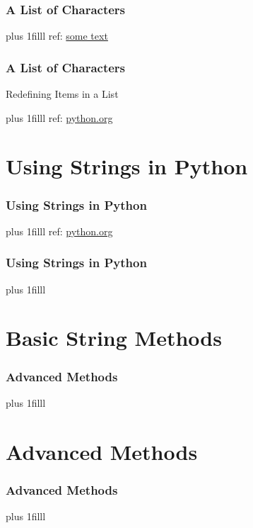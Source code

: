 \documentclass[fleqn]{beamer} %
\newcommand{\sectiontitleII}{A List of Characters }
\newcommand{\sectiontitleIII}{Using Strings in Python}
\newcommand{\sectiontitleIV}{Basic String Methods}
\newcommand{\sectiontitleV}{Advanced Methods}
\newcommand{\btVFill}{\vskip0pt plus 1filll}
\begin{document}
	\begin{frame}[containsverbatim] \small
		\frametitle{\sectiontitleII}
		

		\btVFill
		\tiny{ref: \href{some link}{some text}}
	\end{frame}	

	\begin{frame}[containsverbatim] \small
		\frametitle{\sectiontitleII}
		
		Redefining Items in a List	


		\btVFill
		\tiny{ref: \href{}{python.org}}
	\end{frame}	


\section{\sectiontitleIII}

	\begin{frame}[label=sectionIII, containsverbatim] \small
		\frametitle{\sectiontitleIII}


		\btVFill
		\tiny{ref: \href{}{python.org}}
	\end{frame}

	\begin{frame} \small
		\frametitle{\sectiontitleIII}
		
		
		\btVFill
		\tiny{}	
	\end{frame}

\section{\sectiontitleIV}	
	\begin{frame}[label=sectionIV] \small
		\frametitle{\sectiontitleV}


		\btVFill
		\tiny{} 
	\end{frame}

\section{\sectiontitleV}	
	\begin{frame}[label=sectionV,containsverbatim] \small
	 	\frametitle{\sectiontitleV}    
	

	 	\btVFill
		\tiny{}
	\end{frame}
\end{document}
